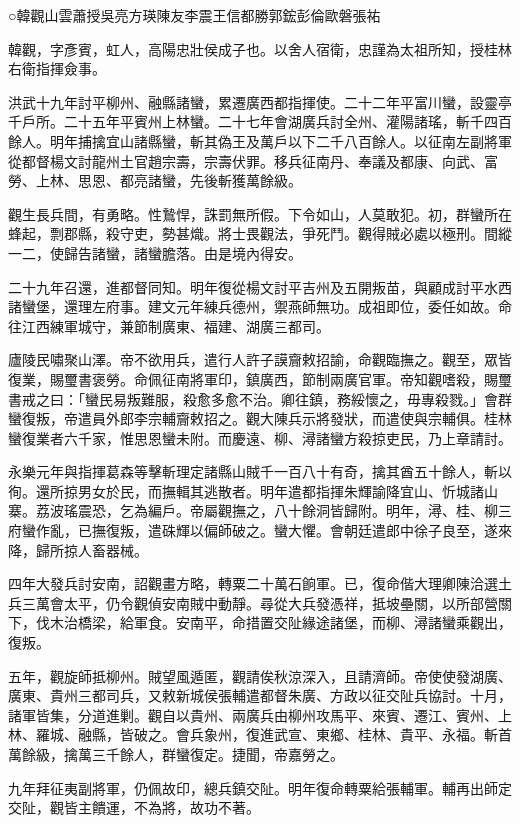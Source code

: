 
\begin{pinyinscope}
○韓觀山雲蕭授吳亮方瑛陳友李震王信都勝郭鋐彭倫歐磐張祐

韓觀，字彥賓，虹人，高陽忠壯侯成子也。以舍人宿衛，忠謹為太祖所知，授桂林右衛指揮僉事。

洪武十九年討平柳州、融縣諸蠻，累遷廣西都指揮使。二十二年平富川蠻，設靈亭千戶所。二十五年平賓州上林蠻。二十七年會湖廣兵討全州、灌陽諸瑤，斬千四百餘人。明年捕擒宜山諸縣蠻，斬其偽王及萬戶以下二千八百餘人。以征南左副將軍從都督楊文討龍州土官趙宗壽，宗壽伏罪。移兵征南丹、奉議及都康、向武、富勞、上林、思恩、都亮諸蠻，先後斬獲萬餘級。

觀生長兵間，有勇略。性鷙悍，誅罰無所假。下令如山，人莫敢犯。初，群蠻所在蜂起，剽郡縣，殺守吏，勢甚熾。將士畏觀法，爭死鬥。觀得賊必處以極刑。間縱一二，使歸告諸蠻，諸蠻膽落。由是境內得安。

二十九年召還，進都督同知。明年復從楊文討平吉州及五開叛苗，與顧成討平水西諸蠻堡，還理左府事。建文元年練兵德州，禦燕師無功。成祖即位，委任如故。命往江西練軍城守，兼節制廣東、福建、湖廣三都司。

廬陵民嘯聚山澤。帝不欲用兵，遣行人許子謨齎敕招諭，命觀臨撫之。觀至，眾皆復業，賜璽書褒勞。命佩征南將軍印，鎮廣西，節制兩廣官軍。帝知觀嗜殺，賜璽書戒之曰：「蠻民易叛難服，殺愈多愈不治。卿往鎮，務綏懷之，毋專殺戮。」會群蠻復叛，帝遣員外郎李宗輔齎敕招之。觀大陳兵示將發狀，而遣使與宗輔俱。桂林蠻復業者六千家，惟思恩蠻未附。而慶遠、柳、潯諸蠻方殺掠吏民，乃上章請討。

永樂元年與指揮葛森等擊斬理定諸縣山賊千一百八十有奇，擒其酋五十餘人，斬以徇。還所掠男女於民，而撫輯其逃散者。明年遣都指揮朱輝諭降宜山、忻城諸山寨。荔波瑤震恐，乞為編戶。帝屬觀撫之，八十餘洞皆歸附。明年，潯、桂、柳三府蠻作亂，已撫復叛，遣硃輝以偏師破之。蠻大懼。會朝廷遣郎中徐子良至，遂來降，歸所掠人畜器械。

四年大發兵討安南，詔觀畫方略，轉粟二十萬石餉軍。已，復命偕大理卿陳洽選土兵三萬會太平，仍令觀偵安南賊中動靜。尋從大兵發憑祥，抵坡壘關，以所部營關下，伐木治橋梁，給軍食。安南平，命措置交阯緣途諸堡，而柳、潯諸蠻乘觀出，復叛。

五年，觀旋師抵柳州。賊望風遁匿，觀請俟秋涼深入，且請濟師。帝使使發湖廣、廣東、貴州三都司兵，又敕新城侯張輔遣都督朱廣、方政以征交阯兵協討。十月，諸軍皆集，分道進剿。觀自以貴州、兩廣兵由柳州攻馬平、來賓、遷江、賓州、上林、羅城、融縣，皆破之。會兵象州，復進武宣、東鄉、桂林、貴平、永福。斬首萬餘級，擒萬三千餘人，群蠻復定。捷聞，帝嘉勞之。

九年拜征夷副將軍，仍佩故印，總兵鎮交阯。明年復命轉粟給張輔軍。輔再出師定交阯，觀皆主饋運，不為將，故功不著。


\end{pinyinscope}
